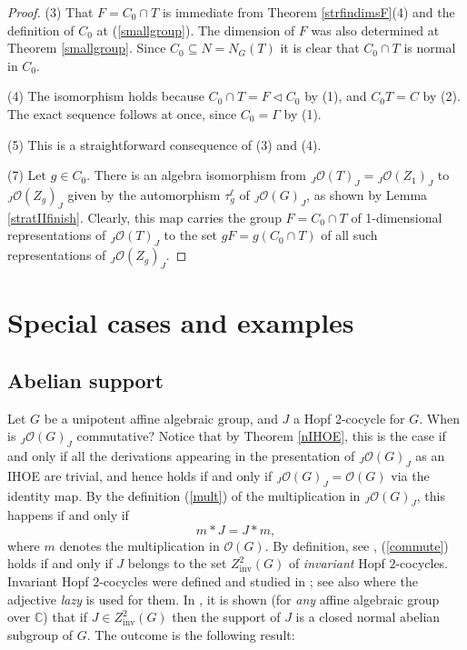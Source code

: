 \documentclass{amsart}
\numberwithin{equation}{section}
\theoremstyle{definition}
\begin{document}
\begin{proof}
(3) That $F = C_0 \cap T$ is immediate from Theorem \ref{strfindimsF}(4) and the definition of $C_0$ at (\ref{smallgroup}). The dimension of $F$ was also determined at Theorem \ref{smallgroup}. Since $C_0 \subseteq N = N_G(T)$ it is clear that $C_0 \cap T$ is normal in $C_0$.

(4) The isomorphism holds because $C_0 \cap T = F \triangleleft C_0$ by (1), and $C_0 T = C$ by (2). The exact sequence follows at once, since $C_0 = \Gamma$ by (1).

(5) This is a straightforward consequence of (3) and (4).

(7) Let $g \in C_0$. There is an algebra isomorphism from ${}_J\mathcal{O}(T)_J = {}_J\mathcal{O}(Z_1)_J$ to ${}_J\mathcal{O}(Z_g)_J$ given by the automorphism $\tau^{\ell}_g$ of ${}_J\mathcal{O}(G)_J$, as shown by Lemma \ref{stratIIfinish}. Clearly, this map carries the group $F=C_0 \cap T$ of 1-dimensional representations of ${}_J\mathcal{O}(T)_J$ to the set $gF=g(C_0 \cap T)$ of all such representations of ${}_J\mathcal{O}(Z_g)_J$.
\end{proof}

\section{Special cases and examples}\label{examples} 

\subsection{Abelian support}\label{abelian} Let $G$ be a unipotent affine algebraic group, and $J$ a Hopf $2$-cocycle for $G$. When is ${}_J\mathcal{O}(G)_J$ commutative? Notice that by Theorem \ref{nIHOE}, this is the case if and only if all the derivations appearing in the presentation of ${}_J\mathcal{O}(G)_J$ as an IHOE are trivial, and hence holds  if and only if ${}_J\mathcal{O}(G)_J = \mathcal{O}(G)$ via the identity map. By the definition (\ref{mult}) of the multiplication in ${}_J\mathcal{O}(G)_J$, this happens if and only if 
\begin{equation}\label{commute} m \ast J = J \ast m,
\end{equation}
where $m$ denotes the multiplication in $\mathcal{O}(G)$. By definition, see \cite[$\S$2.2]{EG4}, (\ref{commute}) holds if and only if $J$ belongs to the set $Z^2_{\mathrm{inv}}(G)$ of \emph{invariant} Hopf $2$-cocycles. Invariant Hopf $2$-cocycles were defined and studied in \cite{S2}; see also \cite{BC} where the adjective \emph{lazy} is used for them.  In \cite[Theorem 4.2]{EG4}, it is shown (for \emph{any} affine algebraic group over $\mathbb{C}$) that if $J \in  Z^2_{\mathrm{inv}}(G)$ then the support of $J$ is a closed normal abelian subgroup of $G$. The outcome is the following result:
\end{document}
